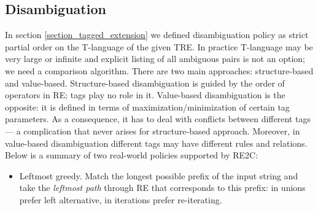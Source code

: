 \documentclass{article}
\theoremstyle{definition}
\begin{document}
\begin{multicols}{2}



\section{Disambiguation}\label{section_disambiguation}

In section \ref{section_tagged_extension} we defined disambiguation policy as strict partial order on the T-language of the given TRE.
In practice T-language may be very large or infinite
and explicit listing of all ambiguous pairs is not an option; we need a comparison algorithm.
There are two main approaches: structure-based and value-based.
Structure-based disambiguation is guided by the order of operators in RE; tags play no role in it.
Value-based disambiguation is the opposite: it is defined in terms of maximization/minimization of certain tag parameters.
As a consequence, it has to deal with conflicts between different tags ---
a complication that never arises for structure-based approach.
Moreover, in value-based disambiguation different tags may have different rules and relations.
Below is a summary of two real-world policies supported by RE2C:
\\

\begin{itemize}
    \setlength{\parskip}{0.5em}
    \item Leftmost greedy.
        Match the longest possible prefix of the input string
        and take the \emph{leftmost path} through RE that corresponds to this prefix:
        in unions prefer left alternative, in iterations prefer re-iterating.


\end{itemize}
\end{multicols}
\end{document}
